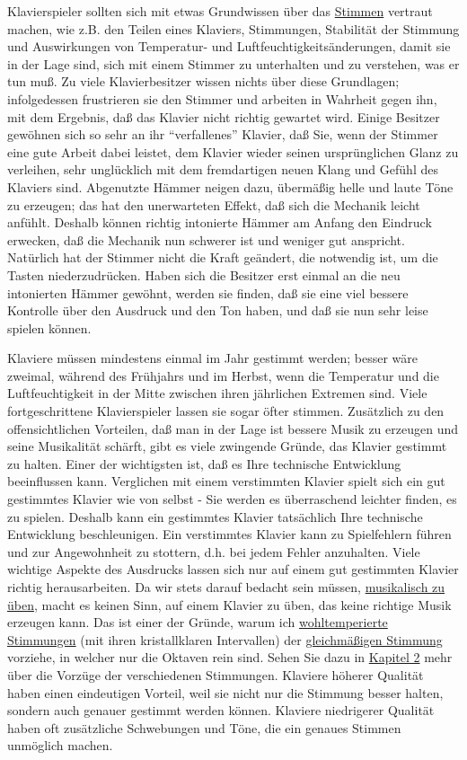 Klavierspieler sollten sich mit etwas Grundwissen über das \hyperref[c2_1]{Stimmen} vertraut machen, wie z.B. den Teilen eines Klaviers, Stimmungen, Stabilität der Stimmung und Auswirkungen von Temperatur- und Luftfeuchtigkeitsänderungen, damit sie in der Lage sind, sich mit einem Stimmer zu unterhalten und zu verstehen, was er tun muß.
Zu viele Klavierbesitzer wissen nichts über diese Grundlagen; infolgedessen frustrieren sie den Stimmer und arbeiten in Wahrheit gegen ihn, mit dem Ergebnis, daß das Klavier nicht richtig gewartet wird.
Einige Besitzer gewöhnen sich so sehr an ihr \enquote{verfallenes} Klavier, daß Sie, wenn der Stimmer eine gute Arbeit dabei leistet, dem Klavier wieder seinen ursprünglichen Glanz zu verleihen, sehr unglücklich mit dem fremdartigen neuen Klang und Gefühl des Klaviers sind.
Abgenutzte Hämmer neigen dazu, übermäßig helle und laute Töne zu erzeugen; das hat den unerwarteten Effekt, daß sich die Mechanik leicht anfühlt.
Deshalb können richtig intonierte Hämmer am Anfang den Eindruck erwecken, daß die Mechanik nun schwerer ist und weniger gut anspricht.
Natürlich hat der Stimmer nicht die Kraft geändert, die notwendig ist, um die Tasten niederzudrücken.
Haben sich die Besitzer erst einmal an die neu intonierten Hämmer gewöhnt, werden sie finden, daß sie eine viel bessere Kontrolle über den Ausdruck und den Ton haben, und daß sie nun sehr leise spielen können.

Klaviere müssen mindestens einmal im Jahr gestimmt werden; besser wäre zweimal, während des Frühjahrs und im Herbst, wenn die Temperatur und die Luftfeuchtigkeit in der Mitte zwischen ihren jährlichen Extremen sind.
Viele fortgeschrittene Klavierspieler lassen sie sogar öfter stimmen.
Zusätzlich zu den offensichtlichen Vorteilen, daß man in der Lage ist bessere Musik zu erzeugen und seine Musikalität schärft, gibt es viele zwingende Gründe, das Klavier gestimmt zu halten.
Einer der wichtigsten ist, daß es Ihre technische Entwicklung beeinflussen kann.
Verglichen mit einem verstimmten Klavier spielt sich ein gut gestimmtes Klavier wie von selbst - Sie werden es überraschend leichter finden, es zu spielen.
Deshalb kann ein gestimmtes Klavier tatsächlich Ihre technische Entwicklung beschleunigen.
Ein verstimmtes Klavier kann zu Spielfehlern führen und zur Angewohnheit zu stottern, d.h. bei jedem Fehler anzuhalten.
Viele wichtige Aspekte des Ausdrucks lassen sich nur auf einem gut gestimmten Klavier richtig herausarbeiten.
Da wir stets darauf bedacht sein müssen, \hyperref[c1iii14d]{musikalisch zu üben}, macht es keinen Sinn, auf einem Klavier zu üben, das keine richtige Musik erzeugen kann.
Das ist einer der Gründe, warum ich \hyperref[c2_2_wtk2]{wohltemperierte Stimmungen} (mit ihren kristallklaren Intervallen) der \hyperref[c2_6_et]{gleichmäßigen Stimmung} vorziehe, in welcher nur die Oktaven rein sind.
Sehen Sie dazu in \hyperref[c2_1]{Kapitel 2} mehr über die Vorzüge der verschiedenen Stimmungen.
Klaviere höherer Qualität haben einen eindeutigen Vorteil, weil sie nicht nur die Stimmung besser halten, sondern auch genauer gestimmt werden können.
Klaviere niedrigerer Qualität haben oft zusätzliche Schwebungen und Töne, die ein genaues Stimmen unmöglich machen.


